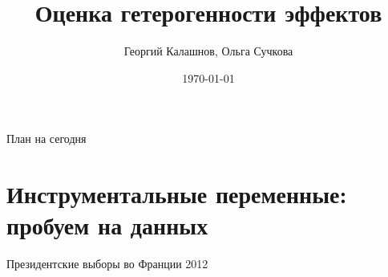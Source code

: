 \documentclass[12pt]{beamer}
\title{Оценка гетерогенности эффектов}
\author[Георгий Калашнов, Ольга Сучкова]{Георгий Калашнов, Ольга Сучкова}
\date{\today}
\begin{document}
\begin{frame}
  \titlepage
  
\end{frame}


\begin{frame}{План на сегодня} 
\tableofcontents
\end{frame}

\section{Инструментальные переменные: пробуем на данных}

\begin{frame}{Президентские выборы во Франции 2012 \parencite{pons2018will}}
\begin{columns}
\begin{column}{0.5\textwidth} 
    

\end{column}
\end{columns}
\end{frame}
\end{document}
